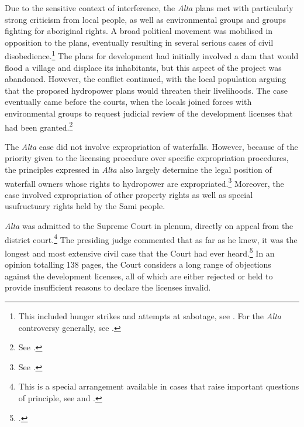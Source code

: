 Due to the sensitive context of interference, the {\it Alta} plans met with particularly strong criticism from local people, as well as environmental groups and groups fighting for aboriginal rights. A broad political movement was mobilised in opposition to the plans, eventually resulting in several serious cases of civil disobedience.\footnote{This included hunger strikes and attempts at sabotage, see \cite[80-83]{nilsen08}. For the {\it Alta} controversy generally, see \cite{hjorthol06,altawiki}.} 
The plans for development had initially involved a dam that would flood a village and displace its inhabitants, but this aspect of the project was abandoned. However, the conflict continued, with the local population arguing that the proposed hydropower plans would threaten their livelihoods. The case eventually came before the courts, when the locals joined forces with environmental groups to request judicial review of the development licenses that had been granted.\footnote{See \cite{eckhoff82}.}

The {\it Alta} case did not involve expropriation of waterfalls. However, because of the priority given to the licensing procedure over specific expropriation procedures, the principles expressed in {\it Alta} also largely determine the legal position of waterfall owners whose rights to hydropower are expropriated.\footnote{See \cite{sauda09,jorpeland11}.} Moreover, the case involved expropriation of other property rights as well as special usufructuary rights held by the Sami people.

{\it Alta} was admitted to the Supreme Court in plenum, directly on appeal from the district court.\footnote{This is a special arrangement available in cases that raise important questions of principle, see \dni\cite[30-2]{cda05} and \dni\cite[5]{ca15}.} The presiding judge commented that as far as he knew, it was the longest and most extensive civil case that the Court had ever heard.\footcite[254]{alta82} In an opinion totalling 138 pages, the Court considers a long range of objections against the development licenses, all of which are either rejected or held to provide insufficient reasons to declare the licenses invalid.

